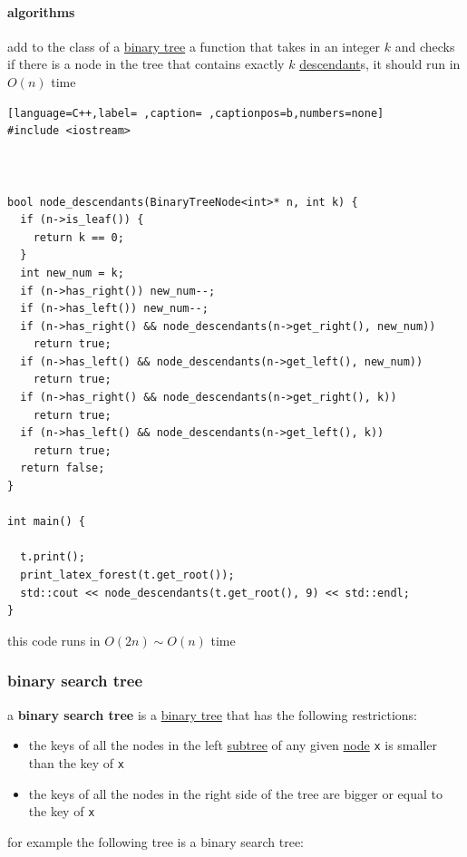 \documentclass[a4paper,12pt]{article}
\begin{document}
\paragraph{algorithms}
\label{sec:orgccbe747}
\begin{question}
add to the class of a \hyperref[sec:org254f5f7]{binary tree} a function that takes in an integer \(k\) and checks if there is a node in the tree that contains exactly \(k\) \hyperref[sec:org3e6c055]{descendant}s, it should run in \(O(n)\) time\\[0pt]
\begin{answer}
\begin{lstlisting}[language=C++,label= ,caption= ,captionpos=b,numbers=none]
#include <iostream>



bool node_descendants(BinaryTreeNode<int>* n, int k) {
  if (n->is_leaf()) {
    return k == 0;
  }
  int new_num = k;
  if (n->has_right()) new_num--;
  if (n->has_left()) new_num--;
  if (n->has_right() && node_descendants(n->get_right(), new_num))
    return true;
  if (n->has_left() && node_descendants(n->get_left(), new_num))
    return true;
  if (n->has_right() && node_descendants(n->get_right(), k))
    return true;
  if (n->has_left() && node_descendants(n->get_left(), k))
    return true;
  return false;
}

int main() {

  t.print();
  print_latex_forest(t.get_root());
  std::cout << node_descendants(t.get_root(), 9) << std::endl;
}
\end{lstlisting}

this code runs in \(O(2n) \sim O(n)\) time\\[0pt]
\end{answer}
\end{question}
\subsubsection{binary search tree}
\label{sec:orge1ff544}
a \textbf{binary search tree} is a \hyperref[sec:org254f5f7]{binary tree} that has the following restrictions:\\[0pt]
\begin{itemize}
\item the keys of all the nodes in the left \hyperref[sec:orgaaf7b83]{subtree} of any given \hyperref[sec:orgec4976f]{node} \texttt{x} is smaller than the key of \texttt{x}\\[0pt]
\item the keys of all the nodes in the right side of the tree are bigger or equal to the key of \texttt{x}\\[0pt]
\end{itemize}
for example the following tree is a binary search tree:\\[0pt]
\begin{center}

\end{center}\\[0pt]
\end{document}
